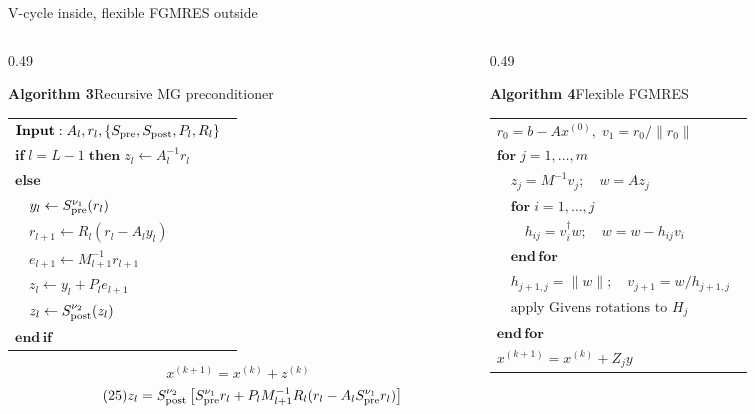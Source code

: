 \documentclass[UTF8,aspectratio=169,11pt,fontset=none]{ctexbeamer}
\begin{document}
\begin{frame}[t,shrink=10]{V-cycle inside, flexible FGMRES outside}
\begin{columns}[T,totalwidth=\textwidth]
\begin{column}{0.49\textwidth}
  \begin{center}\textbf{Algorithm 3}\quad Recursive MG preconditioner\end{center}
  \begin{tabular}{@{}>{\raggedright\arraybackslash}p{0.96\linewidth}@{}}
  \toprule
  \(\mathbf{Input:}\;A_l,r_l,
    \{S_{\rm pre},S_{\rm post},P_l,R_l\}\)\\
  \(\mathbf{if}\;l=L-1\;\mathbf{then}\;
    z_l\gets A_l^{-1}r_l\)\\
  \(\mathbf{else}\)\\
  \(\quad y_l\gets S_{\rm pre}^{\nu_1}(r_l)\)\\
  \(\quad r_{l+1}\gets R_l(r_l-A_l y_l)\)\\
  \(\quad e_{l+1}\gets M_{l+1}^{-1}r_{l+1}\)\\
  \(\quad z_l\gets y_l+P_l e_{l+1}\)\\
  \(\quad z_l\gets S_{\rm post}^{\nu_2}(z_l)\)\\
  \(\mathbf{end\,if}\)\\
  \bottomrule
  \end{tabular}
  \vspace{0.3cm}
  \begin{equation}\tag{24}
  x^{(k+1)}=x^{(k)}+z^{(k)}
  \end{equation}
  \begin{equation}\tag{25}
  z_l=S_{\rm post}^{\nu_2}\left[
  S_{\rm pre}^{\nu_1}r_l+
  P_lM_{l+1}^{-1}R_l
  (r_l-A_lS_{\rm pre}^{\nu_1}r_l)
  \right]
  \end{equation}
\end{column}
\begin{column}{0.49\textwidth}
  \begin{center}\textbf{Algorithm 4}\quad Flexible FGMRES\end{center}
  \begin{tabular}{@{}>{\raggedright\arraybackslash}p{0.96\linewidth}@{}}
  \toprule
  \(r_0=b-Ax^{(0)},\;v_1=r_0/\|r_0\|\)\\
  \(\mathbf{for}\;j=1,\ldots,m\)\\
  \(\quad z_j=M^{-1}v_j;\quad w=Az_j\)\\
  \(\quad \mathbf{for}\;i=1,\ldots,j\)\\
  \(\quad\quad h_{ij}=v_i^\dagger w;\quad
    w=w-h_{ij}v_i\)\\
  \(\quad \mathbf{end\,for}\)\\
  \(\quad h_{j+1,j}=\|w\|;\quad
    v_{j+1}=w/h_{j+1,j}\)\\
  \(\quad \text{apply Givens rotations to }H_j\)\\
  \(\mathbf{end\,for}\)\\
  \(x^{(k+1)}=x^{(k)}+Z_jy\)\\
  \bottomrule
  \end{tabular}
\end{column}
\end{columns}
\end{frame}
\end{document}
